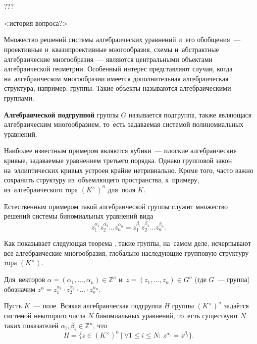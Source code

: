 \documentclass{article}
\begin{document}
\section*{}
\addtocounter{page}{-1}
\thispagestyle{empty}

???
\pagebreak

\renewcommand{\contentsname}{\hfill\bfseries\Large Содержание\hfill}
\renewcommand{\cftaftertoctitle}{\hfill}
\renewcommand{\cftsecleader}{\cftdotfill{\cftdotsep}}
\tableofcontents
\pagebreak


<история вопроса?>

Множество решений системы алгебраических уравнений и его обобщения~— проективные и~квазипроективные многообразия,
схемы и~абстрактные алгебраические многообразия~— являются центральными объектами алгебраической геометрии.
Особенный интерес представляют случаи, когда на~алгебраическом многообразии имеется дополнительная алгебраическая структура,
например, группы. Такие объекты называются алгебраическими группами.

\textbf{Алгебраической подгруппой} группы $G$ называется подгруппа, также являющася
алгебраическим многообразием, то~есть задаваемая системой полиномиальных уравнений.

Наиболее известным примером являются кубики~— плоские алгебраические кривые, задаваемые уравнением третьего порядка.
Однако групповой закон на~эллиптических кривых устроен крайне нетривиально. Кроме того, часто важно сохранить структуру из~объемлющего пространства,
к~примеру, из~алгебраического тора $(K^\times)^n$ для~поля $K$.

Естественным примером такой алгебраической группы служит множество решений системы биномиальных уравнений вида
$$
    z_1^{\alpha_1} z_2^{\alpha_2} \ldots z_n^{\alpha_n} = z_1^{\beta_1} z_2^{\beta_2} \ldots z_n^{\beta_n}.
$$

Как показывает следующая теорема \cite{Schm94}, такие группы, на~самом деле, исчерпывают все алгебраические многообразия,
глобально наследующие групповую структуру тора $(K^\times)$.

Для~векторов $\alpha = (\alpha_1, \ldots, \alpha_n) \in \mathbb{Z}^n$ и~$z = (z_1, \ldots, z_n) \in G^n$ (где $G$~— группа)
обозначим $z^\alpha = z_1^{\alpha_1} \cdot z_2^{\alpha_2} \cdot \ldots \cdot z_n^{\alpha_n}$.

\begin{theorem*}[Шмидт]
    Пусть $K$~— поле. Всякая алгебраическая подгруппа $H$ группы $(K^{\times})^n$ задаётся
    системой некоторого числа $N$ биномиальных уравнений, то~есть существуют $N$ таких показателей $\alpha_i, \beta_i \in \mathbb{Z}^n$, что
    $$
        H = \{ z \in (K^{\times})^n\ |\ \forall 1 \leq i \leq N{:}\ z^{\alpha_i} = z^{\beta_i} \}.
    $$
\end{theorem*}
\end{document}
